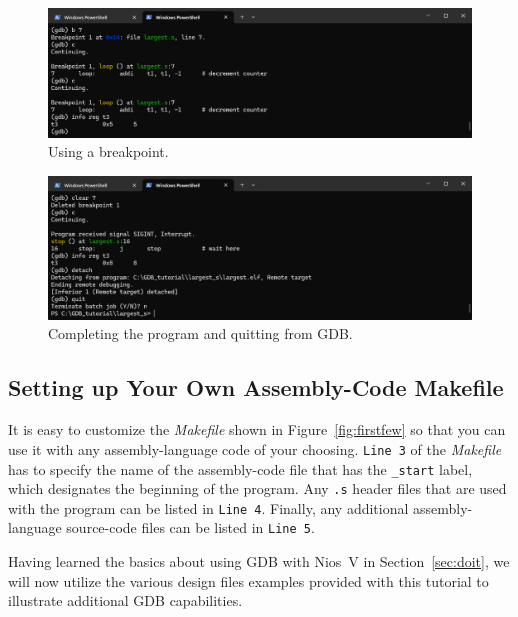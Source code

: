 \documentclass[11pt, twoside, pdftex]{article}
\begin{document}
{\begin{figure}[h]
    \begin{center}
        \includegraphics[scale=.6]{figures/gdb3.png}
        \caption{Using a breakpoint.}
        \label{fig:gdb3}
    \end{center}
\end{figure}

\begin{figure}[h]
    \begin{center}
        \includegraphics[scale=.6]{figures/gdb4.png}
        \caption{Completing the program and quitting from GDB.}
        \label{fig:gdb4}
    \end{center}
\end{figure}

\subsection{Setting up Your Own Assembly-Code Makefile}
\label{sec:yourownass}

It is easy to customize the {\it Makefile} shown in Figure~\ref{fig:firstfew} so that you
can use it with any assembly-language code of your choosing.  \texttt{Line 3} of the
{\it Makefile} has to specify the name of the assembly-code file that has the \texttt{\_start}
label, which designates the beginning of the program. Any \texttt{.s} header files that are
used with the program can be listed in \texttt{Line 4}. Finally, any additional 
assembly-language source-code files can be listed in \texttt{Line 5}. 

Having learned the basics about using GDB with Nios~V in Section~\ref{sec:doit}, we will 
now utilize the various design files examples provided with this tutorial to illustrate
additional GDB capabilities. 

}
\end{document}
